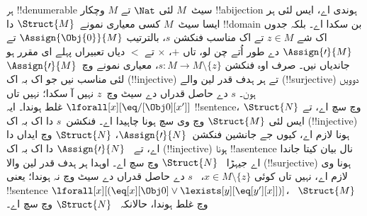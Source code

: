 \documentclass[../../../include/open-logic-section]{subfiles}
\begin{document}
\begin{explain}
ہر !!{denumerable} سیٹ~$M$ لئی $\Nat$ تے $M$
وچکار !!a{bijection} ہوندی اے، ایس لئی ہر ایسا سیٹ~$M$
کسی معیاری نمونے~$\Struct{M}$ دا !!{domain}
بن سکدا اے۔ بلکہ جدوں اک شے $z \in
M$ تے اک مناسب فنکشن $s$، بالترتیب
$\Assign{\Obj{0}}{M}$ تے
$\Assign{\prime}{M}$ دے طور اُتے چن لو،
تاں $+$، $\times$ تے $<$ دیاں تعبیراں
پہلے ای مقرر ہو جاندیاں نیں۔ صرف اوہ فنکشن
$s\colon M \to M \setminus \{z\}$،
معیاری نمونے وچ~$\Assign{\prime}{M}$ لئی مناسب نیں
جو اک بہ اک (!!{injective}) تے ہر ہدف قدر لین والے
(!!{surjective}) دوویں ہون۔ $s$ دے حاصل قدراں دے سیٹ وچ~$z$
نہیں آ سکدا؛ نہیں تاں
$\lforall[x][\eq/[\Obj 0][x']]$ غلط ہوندا۔
ایہ !!{sentence}، $\Struct{N}$ وچ سچ اے،
تے ایس لئی $\Struct{M}$ وچ وی سچ ہونا چاہیدا اے۔
فنکشن~$s$ دا اک بہ اک (!!{injective}) ہونا لازم اے،
کیوں جے جانشین فنکشن~$\Assign{\prime}{N}$،
$\Struct{N}$ وچ ایداں دا اے، تے
~$\Assign{\prime}{N}$ دا اک بہ اک (!!{injective}) ہونا
!!a{sentence} نال بیان کیتا جاندا اے جیہڑا
~$\Struct{N}$ وچ سچ اے۔ اوہدا ہر ہدف قدر لین والا
(!!{surjective}) ہونا وی لازم اے، نہیں تاں کوئی
$x \in M \setminus \{z\}$،
~$s$ دے حاصل قدراں دے سیٹ وچ نہ ہوندا؛ یعنی
!!{sentence} $\lforall[x][(\eq[x][\Obj 0] \lor
\lexists[y][\eq[y'][x]])]$،
~$\Struct{M}$ وچ غلط ہوندا، حالانکہ
~$\Struct{N}$ وچ سچ اے۔
\end{explain}
\end{document}
